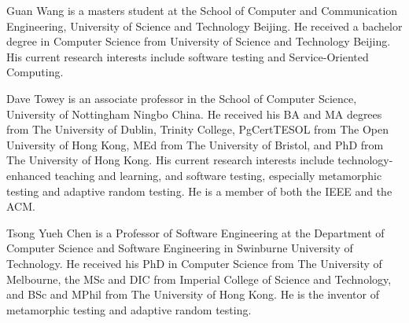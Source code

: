 \documentclass[10pt,journal,compsoc]{IEEEtran}
\begin{document}
\begin{IEEEbiography}{Guan Wang} is a masters student at the School of Computer and Communication Engineering, University of Science and Technology Beijing. He received a bachelor degree in Computer Science from University of Science and Technology Beijing. His current research interests include software testing and Service-Oriented Computing.
\end{IEEEbiography}
\begin{IEEEbiography}{Dave Towey} is an associate professor in the School of Computer Science, University of Nottingham Ningbo China. He received his BA and MA degrees from The University of Dublin, Trinity College, PgCertTESOL from The Open University of Hong Kong, MEd from The University of Bristol, and PhD from The University of Hong Kong. His current research interests include technology-enhanced teaching and learning, and software testing, especially metamorphic testing and adaptive random testing. He is a  member of both the IEEE and the ACM.
\end{IEEEbiography}
\begin{IEEEbiography}{Tsong Yueh Chen} is a Professor of Software Engineering at the Department of Computer Science and Software Engineering in Swinburne University of Technology. He received his PhD in Computer Science from The University of Melbourne, the MSc and DIC from Imperial College of Science and Technology, and BSc and MPhil from The University of Hong Kong. He is the inventor of metamorphic testing and adaptive random testing.
\end{IEEEbiography}
\end{document}
